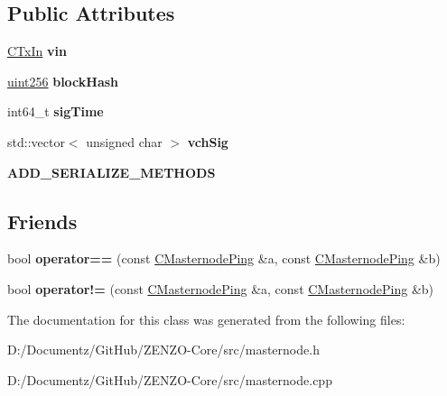 \subsection*{Public Attributes}
\begin{DoxyCompactItemize}
\item 
\mbox{\label{class_c_masternode_ping_a571b8eea88a8e3a0875780e1652db23a}} 
\mbox{\hyperlink{class_c_tx_in}{C\+Tx\+In}} {\bfseries vin}
\item 
\mbox{\label{class_c_masternode_ping_a79701d12b8043278f5054ac2bbdc1634}} 
\mbox{\hyperlink{classuint256}{uint256}} {\bfseries block\+Hash}
\item 
\mbox{\label{class_c_masternode_ping_a6f34bac31f77da61a9584a09b3af7b9e}} 
int64\+\_\+t {\bfseries sig\+Time}
\item 
\mbox{\label{class_c_masternode_ping_a37901b2eeef5ee740e55f3c038b35a15}} 
std\+::vector$<$ unsigned char $>$ {\bfseries vch\+Sig}
\item 
\mbox{\label{class_c_masternode_ping_acc0c4885f3e128b03d5638b077dbd864}} 
{\bfseries A\+D\+D\+\_\+\+S\+E\+R\+I\+A\+L\+I\+Z\+E\+\_\+\+M\+E\+T\+H\+O\+DS}
\end{DoxyCompactItemize}
\subsection*{Friends}
\begin{DoxyCompactItemize}
\item 
\mbox{\label{class_c_masternode_ping_aabbc8547aea2e228bf850e91ddaa8cc9}} 
bool {\bfseries operator==} (const \mbox{\hyperlink{class_c_masternode_ping}{C\+Masternode\+Ping}} \&a, const \mbox{\hyperlink{class_c_masternode_ping}{C\+Masternode\+Ping}} \&b)
\item 
\mbox{\label{class_c_masternode_ping_ad2ecef1cf1f957d3002842b396652028}} 
bool {\bfseries operator!=} (const \mbox{\hyperlink{class_c_masternode_ping}{C\+Masternode\+Ping}} \&a, const \mbox{\hyperlink{class_c_masternode_ping}{C\+Masternode\+Ping}} \&b)
\end{DoxyCompactItemize}


The documentation for this class was generated from the following files\+:\begin{DoxyCompactItemize}
\item 
D\+:/\+Documentz/\+Git\+Hub/\+Z\+E\+N\+Z\+O-\/\+Core/src/masternode.\+h\item 
D\+:/\+Documentz/\+Git\+Hub/\+Z\+E\+N\+Z\+O-\/\+Core/src/masternode.\+cpp\end{DoxyCompactItemize}
